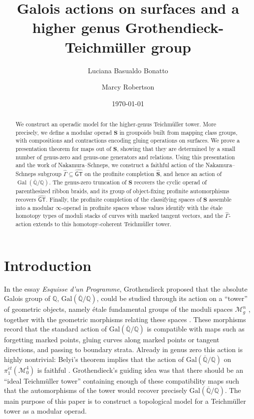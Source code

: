 \documentclass{amsart}
\title[Galois actions on surfaces]{Galois actions on surfaces and a higher genus Grothendieck-Teichm\"{u}ller group}
\author[L. Basualdo Bonatto]{Luciana Basualdo Bonatto}
\author[M. Robertson]{Marcy Robertson}
\date{\today}
\newcommand{\bS}{\mathbf{S}}
\newcommand{\galQ}{\mathbf{\mathrm{Gal}}(\overline{\mathbb{Q}}/\mathbb{Q})}
\newcommand{\GT}{\widehat{\mathsf{GT}}}
\newcommand{\NS}{\widehat{\mathsf{\Gamma}}}
\theoremstyle{definition}
\numberwithin{equation}{section}
\begin{document}
\begin{abstract}
We construct an operadic model for the higher-genus Teichm\"uller tower. More precisely, we define a modular operad $\bS$ in groupoids built from mapping class groups, with compositions and contractions encoding gluing operations on surfaces. We prove a presentation theorem for maps out of $\bS$, showing that they are determined by a small number of genus-zero and genus-one generators and relations. Using this presentation and the work of Nakamura--Schneps, we construct a faithful action of the Nakamura--Schneps subgroup $\NS\subseteq\GT$ on the profinite completion $\widehat{\bS}$, and hence an action of $\operatorname{Gal}(\overline{\mathbb Q}/\mathbb Q)$. The genus-zero truncation of $\bS$ recovers the cyclic operad of parenthesized ribbon braids, and its group of object-fixing profinite automorphisms recovers $\GT$. Finally, the profinite completion of the classifying spaces of $\bS$ assemble into a modular $\infty$-operad in profinite spaces whose values identify with the \'etale homotopy types of moduli stacks of curves with marked tangent vectors, and the $\NS$-action extends to this homotopy-coherent Teichm\"uller tower.
\end{abstract}


\maketitle
\section{Introduction}

In the essay \emph{Esquisse d'un Programme}, Grothendieck proposed that the absolute Galois group of $\mathbb Q$, $\galQ$, could be studied through its action on a ``tower'' of geometric objects, namely \'etale fundamental groups of the moduli spaces $\mathcal M_{g}^{n}$ , together with the geometric morphisms relating these spaces \cite{grothendieck_esquisse}. These morphisms record that the standard action of $\galQ$ is compatible with maps such as forgetting marked points, gluing curves along marked points or tangent directions, and passing to boundary strata.  Already in genus zero this action is highly nontrivial:  Belyi's theorem implies that the action of $\galQ$ on $\pi_1^{\acute et}(\mathcal M_0^4)$ is faithful \cite{belyi}. Grothendieck's guiding idea was that there should be an ``ideal Teichm\"uller tower'' containing enough of these compatibility maps such that the automorphisms of the tower would recover precisely $\galQ$. The main purpose of this paper is to construct a topological model for a Teichm\"uller tower as a modular operad.
\end{document}

